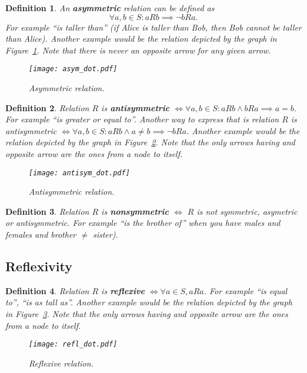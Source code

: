 \documentclass[11pt]{article}
\theoremstyle{plain}
\newtheorem{defn}{Definition}
\theoremstyle{definition}
\begin{document}
\begin{defn}
  An \textbf{asymmetric} relation can be defined as
  \[ \forall a, b \in S: aRb \implies \neg bRa .\]
  For example ``is taller than'' (if Alice is taller than Bob, then Bob cannot be taller than Alice).
  Another example would be the relation depicted by the graph in Figure~\ref{fig:asym}.
  Note that there is never an opposite arrow for any given arrow.

  \begin{figure}[th!]
    \centering
    \texttt{[image: asym\_dot.pdf]}
    \caption{Asymmetric relation.\label{fig:asym}}
  \end{figure}
\end{defn}

\begin{defn}
  Relation $R$ is \textbf{antisymmetric} $\iff \forall a, b \in S: aRb \land bRa \implies a = b$.
  For example ``is greater or equal to''.
  Another way to express that is relation $R$ is antisymmetric $\iff \forall a, b \in S: aRb \land a \neq b \implies \neg bRa$.
  Another example would be the relation depicted by the graph in Figure~\ref{fig:antisym}.
  Note that the only arrows having and opposite arrow are the ones from a node to itself.

  \begin{figure}[th!]
    \centering
    \texttt{[image: antisym\_dot.pdf]}
    \caption{Antisymmetric relation.\label{fig:antisym}}
  \end{figure}
\end{defn}

\begin{defn}
  Relation $R$ is \textbf{nonsymmetric} $\iff$ $R$ is not symmetric, asymetric or antisymmetric.
  For example ``is the brother of'' when you have males and females and brother $\neq$ sister).
\end{defn}

\subsection{Reflexivity}

\begin{defn}
  Relation $R$ is \textbf{reflexive} $\iff \forall a \in S, aRa$.
  For example ``is equal to'', ``is as tall as''.
  Another example would be the relation depicted by the graph in Figure~\ref{fig:refl}.
  Note that the only arrows having and opposite arrow are the ones from a node to itself.
  \begin{figure}[th!]
    \centering
    \texttt{[image: refl\_dot.pdf]}
    \caption{Reflexive relation.\label{fig:refl}}
  \end{figure}
\end{defn}
\end{document}
